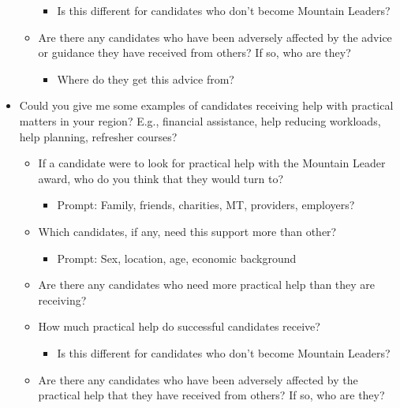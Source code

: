 \documentclass[
  12pt,
  a4paper,
]{book}
\providecommand{\tightlist}{%
  \setlength{\itemsep}{0pt}\setlength{\parskip}{0pt}}
\begin{document}
\begin{itemize}
\begin{itemize}
    \begin{itemize}
    \tightlist
    \item
      Is this different for candidates who don't become Mountain Leaders?
    \end{itemize}
  \item
    Are there any candidates who have been adversely affected by the advice or guidance they have received from others? If so, who are they?

    \begin{itemize}
    \tightlist
    \item
      Where do they get this advice from?
    \end{itemize}
  \end{itemize}
\item
  Could you give me some examples of candidates receiving help with practical matters in your region? E.g., financial assistance, help reducing workloads, help planning, refresher courses?

  \begin{itemize}
  \tightlist
  \item
    If a candidate were to look for practical help with the Mountain Leader award, who do you think that they would turn to?

    \begin{itemize}
    \tightlist
    \item
      Prompt: Family, friends, charities, MT, providers, employers?
    \end{itemize}
  \item
    Which candidates, if any, need this support more than other?

    \begin{itemize}
    \tightlist
    \item
      Prompt: Sex, location, age, economic background
    \end{itemize}
  \item
    Are there any candidates who need more practical help than they are receiving?
  \item
    How much practical help do successful candidates receive?

    \begin{itemize}
    \tightlist
    \item
      Is this different for candidates who don't become Mountain Leaders?
    \end{itemize}
  \item
    Are there any candidates who have been adversely affected by the practical help that they have received from others? If so, who are they?


\end{itemize}
\end{itemize}
\end{document}
